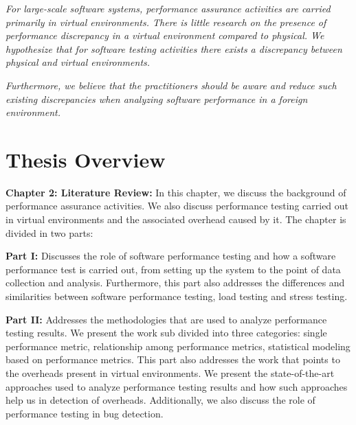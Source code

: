 \begin{framed}
		\textit{For large-scale software systems, performance assurance activities are carried primarily in virtual environments. There is little research on the presence of performance discrepancy in a virtual environment compared to physical. We hypothesize that for software testing activities there exists a discrepancy between physical and virtual environments.} %
		\par 	
		\textit{Furthermore, we believe that the practitioners should be aware and reduce such existing discrepancies when analyzing software performance in a foreign environment.}
\end{framed}



\section{Thesis Overview}


\textbf{Chapter 2: Literature Review:} In this chapter, we discuss the background of performance assurance activities. We also discuss performance testing carried out in virtual environments and the associated overhead caused by it. The chapter is divided in two parts:

	\textbf{Part I:} Discusses the role of software performance testing and how a software performance test is carried out, from setting up the system to the point of data collection and analysis. Furthermore, this part also addresses the differences and similarities between software performance testing, load testing and stress testing.

	\textbf{Part II:} Addresses the methodologies that are used to analyze performance testing results. We present the work sub divided into three categories: single performance metric, relationship among performance metrics, statistical modeling based on performance metrics. This part also addresses the work that points to the overheads present in virtual environments. We present the state-of-the-art approaches used to analyze performance testing results and how such approaches help us in detection of overheads. Additionally, we also discuss the role of performance testing in bug detection. 

